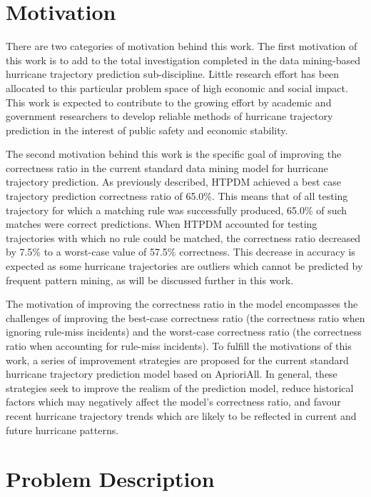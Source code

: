 \documentclass[12pt,conference]{IEEEtran}
\begin{document}
\section{Motivation}

There are two categories of motivation behind this work. The first motivation of this work is to add to the total investigation completed in the data mining-based hurricane trajectory prediction sub-discipline. Little research effort has been allocated to this particular problem space of high economic and social impact. This work is expected to contribute to the growing effort by academic and government researchers to develop reliable methods of hurricane trajectory prediction in the interest of public safety and economic stability.

The second motivation behind this work is the specific goal of improving the correctness ratio in the current standard data mining model for hurricane trajectory prediction. As previously described, HTPDM achieved a best case trajectory prediction correctness ratio of 65.0\%. This means that of all testing trajectory for which a matching rule was successfully produced, 65.0\% of such matches were correct predictions. When HTPDM accounted for testing trajectories with which no rule could be matched, the correctness ratio decreased by 7.5\% to a worst-case value of 57.5\% correctness. This decrease in accuracy is expected as some hurricane trajectories are outliers which cannot be predicted by frequent pattern mining, as will be discussed further in this work.

The motivation of improving the correctness ratio in the model encompasses the challenges of improving the best-case correctness ratio (the correctness ratio when ignoring rule-miss incidents) and the worst-case correctness ratio (the correctness ratio when accounting for rule-miss incidents). To fulfill the motivations of this work, a series of improvement strategies are proposed for the current standard hurricane trajectory prediction model based on AprioriAll. In general, these strategies seek to improve the realism of the prediction model, reduce historical factors which may negatively affect the model's correctness ratio, and favour recent hurricane trajectory trends which are likely to be reflected in current and future hurricane patterns.

\section{Problem Description}
\end{document}
